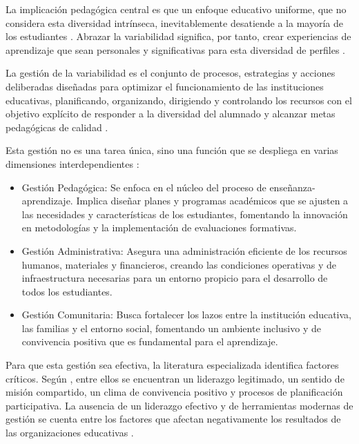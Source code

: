 {{{            La implicación pedagógica central es que un enfoque educativo uniforme, que
            no considera esta diversidad intrínseca, inevitablemente desatiende a la
            mayoría de los estudiantes \citep{rose2007udl}. Abrazar la variabilidad
            significa, por tanto, crear experiencias de aprendizaje que sean personales y
            significativas para esta diversidad de perfiles \citep{cast2018udl}.

            La gestión de la variabilidad es el conjunto de procesos, estrategias y acciones
            deliberadas diseñadas para optimizar el funcionamiento de las instituciones
            educativas, planificando, organizando, dirigiendo y controlando los recursos
            con el objetivo explícito de responder a la diversidad del alumnado y alcanzar
            metas pedagógicas de calidad \citep{weinstein2002liderazgo}.

            Esta gestión no es una tarea única, sino una función que se despliega en varias
            dimensiones interdependientes \citep{weinstein2002liderazgo}:
            \begin{itemize}
                \item Gestión Pedagógica: Se enfoca en el núcleo del proceso de enseñanza-
                aprendizaje. Implica diseñar planes y programas académicos que se
                ajusten a las necesidades y características de los estudiantes,
                fomentando la innovación en metodologías y la implementación de
                evaluaciones formativas.
                \item  Gestión Administrativa: Asegura una administración eficiente de los
                recursos humanos, materiales y financieros, creando las condiciones
                operativas y de infraestructura necesarias para un entorno propicio para
                el desarrollo de todos los estudiantes.
                \item  Gestión Comunitaria: Busca fortalecer los lazos entre la institución
                educativa, las familias y el entorno social, fomentando un ambiente
                inclusivo y de convivencia positiva que es fundamental para el
                aprendizaje.
            \end{itemize}

            Para que esta gestión sea efectiva, la literatura especializada identifica factores
            críticos. Según \citet{weinstein2002liderazgo}, entre ellos se encuentran un liderazgo
            legitimado, un sentido de misión compartido, un clima de convivencia positivo y 
            procesos de planificación participativa. La ausencia de un liderazgo efectivo y
            de herramientas modernas de gestión se cuenta entre los factores que afectan
            negativamente los resultados de las organizaciones educativas \citep{weinstein2002liderazgo}.
        }

}}
